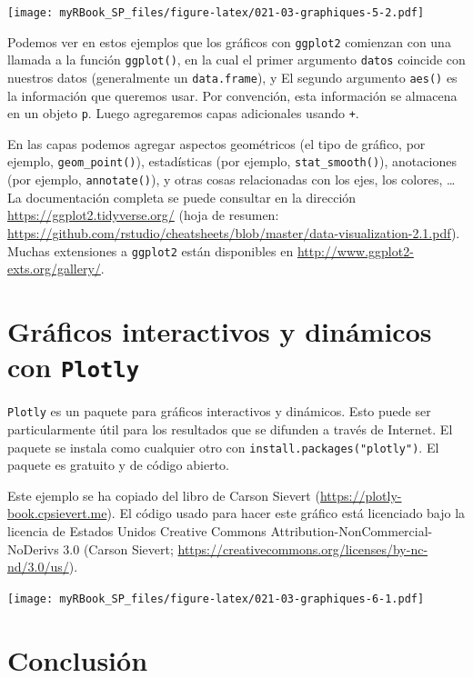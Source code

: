 \documentclass[
]{book}
\begin{document}
\texttt{[image: myRBook\_SP\_files/figure-latex/021-03-graphiques-5-2.pdf]}

Podemos ver en estos ejemplos que los gráficos con \texttt{ggplot2} comienzan con una llamada a la función \texttt{ggplot()}, en la cual el primer argumento \texttt{datos} coincide con nuestros datos (generalmente un \texttt{data.frame}), y El segundo argumento \texttt{aes()} es la información que queremos usar. Por convención, esta información se almacena en un objeto \texttt{p}. Luego agregaremos capas adicionales usando \texttt{+}.

En las capas podemos agregar aspectos geométricos (el tipo de gráfico, por ejemplo, \texttt{geom\_point()}), estadísticas (por ejemplo, \texttt{stat\_smooth()}), anotaciones (por ejemplo, \texttt{annotate()}), y otras cosas relacionadas con los ejes, los colores, \ldots{} La documentación completa se puede consultar en la dirección \url{https://ggplot2.tidyverse.org/} (hoja de resumen: \url{https://github.com/rstudio/cheatsheets/blob/master/data-visualization-2.1.pdf}). Muchas extensiones a \texttt{ggplot2} están disponibles en \url{http://www.ggplot2-exts.org/gallery/}.

\hypertarget{gruxe1ficos-interactivos-y-dinuxe1micos-con-plotly}{%
\section{\texorpdfstring{Gráficos interactivos y dinámicos con \texttt{Plotly}}{Gráficos interactivos y dinámicos con Plotly}}\label{gruxe1ficos-interactivos-y-dinuxe1micos-con-plotly}}

\texttt{Plotly} es un paquete para gráficos interactivos y dinámicos. Esto puede ser particularmente útil para los resultados que se difunden a través de Internet. El paquete se instala como cualquier otro con \texttt{install.packages("plotly")}. El paquete es gratuito y de código abierto.

Este ejemplo se ha copiado del libro de Carson Sievert (\url{https://plotly-book.cpsievert.me}). El código usado para hacer este gráfico está licenciado bajo la licencia de Estados Unidos Creative Commons Attribution-NonCommercial-NoDerivs 3.0 (Carson Sievert; \url{https://creativecommons.org/licenses/by-nc-nd/3.0/us/}).

\texttt{[image: myRBook\_SP\_files/figure-latex/021-03-graphiques-6-1.pdf]}

\hypertarget{conclusiuxf3n-10}{%
\section{Conclusión}\label{conclusiuxf3n-10}}
\end{document}
